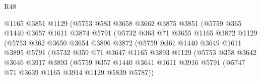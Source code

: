 \begin{lexlean}{R48}
\begin{coremodule}
                                @1165
                                @3851
                                @1129
                                (@5753
                                  @583
                                  @3658
                                  @3662
                                  @3875
                                  @3851
                                  (@5759
                                    @365
                                    @1440
                                    @3657
                                    @1611
                                    @3874
                                    @5791
                                    (@5732
                                      @363
                                      @71
                                      @3655
                                      @1165
                                      @3872
                                      @1129
                                      (@5753
                                        @362
                                        @3650
                                        @3654
                                        @3896
                                        @3872
                                        (@5759
                                          @361
                                          @1440
                                          @3649
                                          @1611
                                          @3895
                                          @5791
                                          (@5732
                                            @359
                                            @71
                                            @3647
                                            @1165
                                            @3893
                                            @1129
                                            (@5753
                                              @358
                                              @3642
                                              @3646
                                              @3917
                                              @3893
                                              (@5759
                                                @357
                                                @1440
                                                @3641
                                                @1611
                                                @3916
                                                @5791
                                                (@5747 @71 @3639 @1165 @3914 @1129 @5839 @5787))

\end{coremodule}
\end{lexlean}
